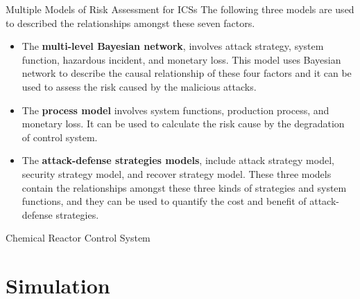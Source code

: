 \documentclass[10pt]{beamer}
\begin{document}
\begin{frame}{Multiple Models of Risk Assessment for ICSs}
The following three models are used to described the relationships amongst these seven factors.

\begin{itemize}[<+->]
  \item The \textbf{multi-level Bayesian network}, involves attack strategy, system function, hazardous incident, and monetary loss. This model uses Bayesian network to describe the causal relationship of these four factors and it can be used to assess the risk caused by the malicious attacks.
  \item The \textbf{process model} involves system functions, production process, and monetary loss. It can be used to calculate the risk cause by the degradation of control system.
  \item The \textbf{attack-defense strategies models}, include attack strategy model, security strategy model, and recover strategy model. These three models contain the relationships amongst these three kinds of strategies and system functions, and they can be used to quantify the cost and benefit of attack-defense strategies.
\end{itemize}
\end{frame}

\begin{frame}{Chemical Reactor Control System}
    \resizebox{\textwidth}{!}{}
\end{frame}

\section{Simulation}
\end{document}
